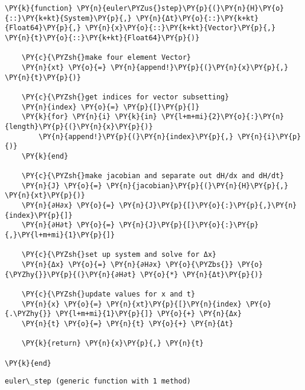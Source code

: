 \documentclass[11pt]{article}
\begin{document}
    \begin{tcolorbox}[breakable, size=fbox, boxrule=1pt, pad at break*=1mm,colback=cellbackground, colframe=cellborder]
\begin{Verbatim}[commandchars=\\\{\}]
\PY{k}{function} \PY{n}{euler\PYZus{}step}\PY{p}{(}\PY{n}{H}\PY{o}{::}\PY{k+kt}{System}\PY{p}{,} \PY{n}{Δt}\PY{o}{::}\PY{k+kt}{Float64}\PY{p}{,} \PY{n}{x}\PY{o}{::}\PY{k+kt}{Vector}\PY{p}{,} \PY{n}{t}\PY{o}{::}\PY{k+kt}{Float64}\PY{p}{)}
    
    \PY{c}{\PYZsh{}make four element Vector}
    \PY{n}{xt} \PY{o}{=} \PY{n}{append!}\PY{p}{(}\PY{n}{x}\PY{p}{,} \PY{n}{t}\PY{p}{)}

    \PY{c}{\PYZsh{}get indices for vector subsetting}
    \PY{n}{index} \PY{o}{=} \PY{p}{[}\PY{p}{]}
    \PY{k}{for} \PY{n}{i} \PY{k}{in} \PY{l+m+mi}{2}\PY{o}{:}\PY{n}{length}\PY{p}{(}\PY{n}{x}\PY{p}{)}
        \PY{n}{append!}\PY{p}{(}\PY{n}{index}\PY{p}{,} \PY{n}{i}\PY{p}{)}
    \PY{k}{end}

    \PY{c}{\PYZsh{}make jacobian and separate out dH/dx and dH/dt}
    \PY{n}{J} \PY{o}{=} \PY{n}{jacobian}\PY{p}{(}\PY{n}{H}\PY{p}{,} \PY{n}{xt}\PY{p}{)}
    \PY{n}{∂H∂x} \PY{o}{=} \PY{n}{J}\PY{p}{[}\PY{o}{:}\PY{p}{,}\PY{n}{index}\PY{p}{]}
    \PY{n}{∂H∂t} \PY{o}{=} \PY{n}{J}\PY{p}{[}\PY{o}{:}\PY{p}{,}\PY{l+m+mi}{1}\PY{p}{]}

    \PY{c}{\PYZsh{}set up system and solve for Δx}
    \PY{n}{Δx} \PY{o}{=} \PY{n}{∂H∂x} \PY{o}{\PYZbs{}} \PY{o}{\PYZhy{}}\PY{p}{(}\PY{n}{∂H∂t} \PY{o}{*} \PY{n}{Δt}\PY{p}{)}

    \PY{c}{\PYZsh{}update values for x and t}
    \PY{n}{x} \PY{o}{=} \PY{n}{xt}\PY{p}{[}\PY{n}{index} \PY{o}{.\PYZhy{}} \PY{l+m+mi}{1}\PY{p}{]} \PY{o}{+} \PY{n}{Δx}
    \PY{n}{t} \PY{o}{=} \PY{n}{t} \PY{o}{+} \PY{n}{Δt}

    \PY{k}{return} \PY{n}{x}\PY{p}{,} \PY{n}{t}

\PY{k}{end}
\end{Verbatim}
\end{tcolorbox}

            \begin{tcolorbox}[breakable, size=fbox, boxrule=.5pt, pad at break*=1mm, opacityfill=0]
\begin{Verbatim}[commandchars=\\\{\}]
euler\_step (generic function with 1 method)
\end{Verbatim}
\end{tcolorbox}
        
\end{document}
